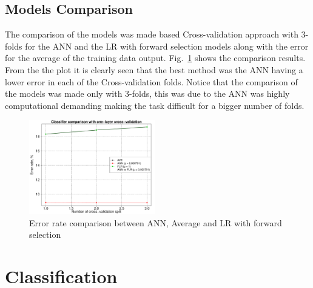 \documentclass[10pt, paper=a4]{article}
\begin{document}
\subsection{Models Comparison}
The comparison of the models was made based Cross-validation approach with 3-folds for the ANN and the LR with forward selection models along with the error for the average of the training data output. Fig.~\ref{fig:lr_comparison} shows the comparison results. From the the plot it is clearly seen that the best method was the ANN having a lower error in each of the Cross-validation folds. Notice that the comparison of the models was made only with 3-folds, this was due to the ANN was highly computational demanding making the task difficult for a bigger number of folds.

\begin{figure}[h]
\centering
\includegraphics[width = 0.49\textwidth]{Regression_comparison1.pdf}
\caption{Error rate comparison between ANN, Average and LR with forward selection}
\label{fig:lr_comparison}
\end{figure}

\clearpage
\section{Classification}
\label{sec:classification}
\end{document}

